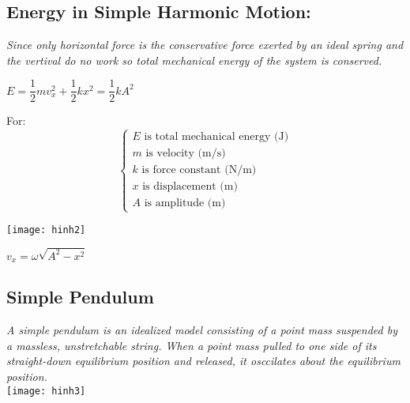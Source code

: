 \documentclass[10pt]{article}
\begin{document}
\subsection{Energy in Simple Harmonic Motion: } 
\textit{Since only horizontal force is the conservative force exerted by an ideal spring and the vertival do no work so total mechanical energy of the system is conserved.} \\
	\begin{mybox}
		\begin{center}
			$E = \dfrac{1}{2} m v_{x}^{2} + \dfrac{1}{2} k x^{2} = \dfrac{1}{2} k A^{2}$
		\end{center}
	\end{mybox}
	For: \\
	$$
	\begin{cases}
		E \mbox{ is total mechanical energy (J)} \\
		m \mbox{ is velocity (m/s)} \\
		k \mbox{ is force constant (N/m)} \\
		x \mbox{ is displacement (m)} \\
		A \mbox{ is amplitude (m)}
	\end{cases}
	$$

	\texttt{[image: hinh2]}
	\bigbreak

	\begin{mybox}
		\begin{center}
			$v_{x} = \omega \sqrt{A^{2} - x^{2}}$
		\end{center}
	\end{mybox}

\subsection{Simple Pendulum}
\textit{A simple pendulum is an idealized model consisting of a point mass suspended by a massless, unstretchable string. When a point mass pulled to one side of its straight-down equilibrium position and released, it osccilates about the equilibrium position.} \\

\texttt{[image: hinh3]}
\bigbreak
\end{document}
